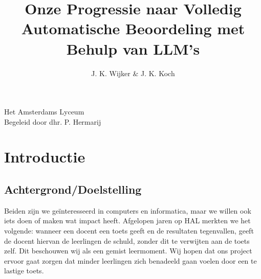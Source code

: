 \documentclass[12pt]{article}
\title{Onze Progressie naar Volledig Automatische Beoordeling met Behulp van LLM's}
\author{J. K. Wijker & J. K. Koch}
\begin{document}
\maketitle
\mbox{}
\vfill
\begin{flushright}
\large Het Amsterdams Lyceum\\
\scriptsize Begeleid door dhr. P. Hermarij \normalsize
\end{flushright}
\thispagestyle{empty}
\pagebreak

{\small\tableofcontents \normalsize}

\pagebreak
\section{Introductie}
\begin{multicols}{2}
\subsection{Achtergrond/Doelstelling} 

Beiden zijn we geïnteresseerd in computers en informatica, maar we willen ook iets doen of maken wat impact heeft. Afgelopen jaren op HAL merkten we het volgende: wanneer een docent een toets geeft en de resultaten tegenvallen, geeft de docent hiervan de leerlingen de schuld, zonder dit te verwijten aan de toets zelf. Dit beschouwen wij als een gemist leermoment. Wij hopen dat ons project ervoor gaat zorgen dat minder leerlingen zich benadeeld gaan voelen door een te lastige toets. 



\end{multicols}
\end{document}
